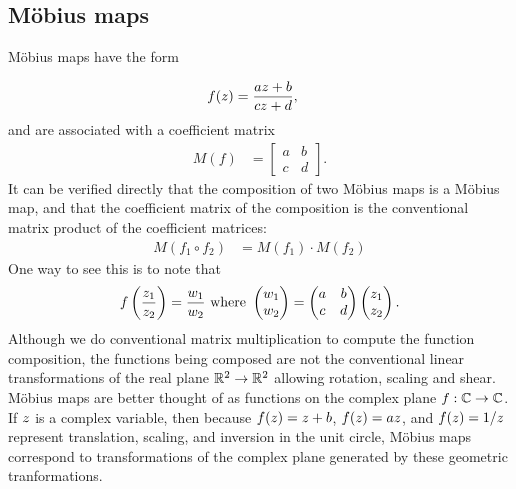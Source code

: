 \subsection{M\"obius maps}
\label{sec:moebiusdef}
M\"obius maps have the form

\begin{align}	f(z) &=  \frac{a z +b}{c z+ d},
\end{align}
and are associated with a coefficient matrix
\begin{align}
	M(f) &=
	\begin{bmatrix}
		a & b \\ c & d	\end{bmatrix}.
\end{align}
It can be verified directly that the composition of two M\"obius maps is a M\"obius map, and that the coefficient matrix of the composition is the conventional matrix product of the coefficient matrices:
\begin{align}
	M(f_1 \circ f_2) &= M(f_1 ) \cdot M( f_2)
\end{align}
One way to see this is to note that 
\begin{equation}
	f\left(\frac{z_1}{z_2}\right) =\frac{w_1}{w_2}  \mbox{ where } 	\begin{pmatrix}
		w_1 \\ w_2 
	\end{pmatrix} = 
	\begin{pmatrix}
		a & b \\ c & d
	\end{pmatrix} 
	\begin{pmatrix}
		z_1 \\ z_2
	\end{pmatrix}.
\end{equation}
Although we do conventional matrix multiplication to compute the function composition, the functions being composed are not the conventional linear transformations of the real plane  $\mathbb{R}^2\rightarrow\mathbb{R}^2$ allowing rotation, scaling and shear. M\"obius maps are better thought of as functions on the complex plane  $f:\mathbb{C}\rightarrow\mathbb{C}$.  
If $z$ is a complex variable, then because $f(z)=z+b$, $f(z)=a z$, and $f(z)=1/z$  represent translation, scaling, and inversion in the unit circle,  M\"obius maps correspond to transformations of the complex plane generated by these geometric tranformations. 

